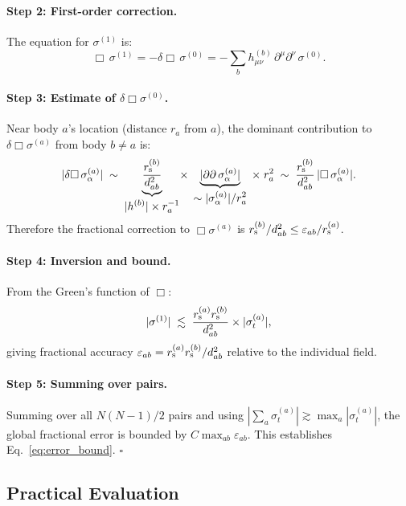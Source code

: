 \documentclass[11pt,a4paper]{article}
\theoremstyle{definition}
\theoremstyle{remark}
\newcommand{\rs}[1]{r_{\rm s}^{(#1)}}
\newcommand{\sig}[2]{\sigma_{#1}^{(#2)}}
\begin{document}
		\paragraph{Step 2: First-order correction.}
		The equation for $\sigma^{(1)}$ is:
		\begin{equation}
			\Box\,\sigma^{(1)} = -\delta\Box\,\sigma^{(0)}
			= -\sum_b h_{\mu\nu}^{(b)}\,\partial^\mu\partial^\nu\,\sigma^{(0)}.
			\label{eq:correction_eq}
		\end{equation}
		
		\paragraph{Step 3: Estimate of $\delta\Box\sigma^{(0)}$.}
		Near body $a$'s location (distance $r_a$ from $a$), the dominant
		contribution to $\delta\Box\sigma^{(a)}$ from body $b\neq a$ is:
		\begin{equation}
			|\delta\Box\,\sig{\alpha}{a}|
			\;\sim\;
			\underbrace{\frac{\rs{b}}{d_{ab}^2}}_{\displaystyle|h^{(b)}|\times r_a^{-1}}
			\!\times\;
			\underbrace{|\partial\partial\,\sig{\alpha}{a}|}_{\displaystyle\sim |\sig{\alpha}{a}|/r_a^2}
			\;\times\; r_a^2
			\;\sim\;
			\frac{\rs{b}}{d_{ab}^2}\,|\Box\,\sig{\alpha}{a}|.
		\end{equation}
		Therefore the fractional correction to $\Box\sigma^{(a)}$ is
		$\rs{b}/d_{ab}^2\leq\varepsilon_{ab}/\rs{a}$.
		
		\paragraph{Step 4: Inversion and bound.}
		From the Green's function of $\Box$:
		\begin{equation}
			|\sigma^{(1)}|
			\;\lesssim\;
			\frac{\rs{a}\rs{b}}{d_{ab}^2}
			\times|\sig{t}{a}|,
		\end{equation}
		giving fractional accuracy $\varepsilon_{ab}=\rs{a}\rs{b}/d_{ab}^2$
		relative to the individual field.
		
		\paragraph{Step 5: Summing over pairs.}
		Summing over all $N(N-1)/2$ pairs and using
		$|\sum_a\sig{t}{a}|\gtrsim\max_a|\sig{t}{a}|$, the global fractional
		error is bounded by $C\max_{ab}\varepsilon_{ab}$.  This establishes
		Eq.~\eqref{eq:error_bound}. \hfill$\square$
	
	\subsection{Practical Evaluation}
	
\end{document}
